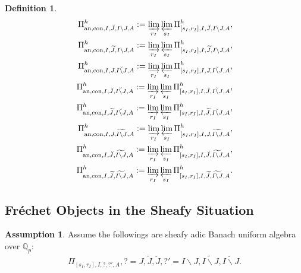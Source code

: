 \documentclass[12pt]{amsart}
\theoremstyle{definition}
\newtheorem{definition}[theorem]{Definition}
\numberwithin{equation}{section}
\newtheorem{assumption}[theorem]{Assumption}
\begin{document}
\begin{definition}
\begin{align}
\Pi^h_{\mathrm{an},\mathrm{con},I,\breve{J},I\backslash J,A}:=\varinjlim_{r_I}\varprojlim_{s_I}\Pi^h_{[s_I,r_I],I,\breve{J},I\backslash J,A},\\	
\Pi^h_{\mathrm{an},\mathrm{con},I,\widetilde{J},I\backslash J,A}:=\varinjlim_{r_I}\varprojlim_{s_I} \Pi^h_{[s_I,r_I],I,\widetilde{J},I\backslash J,A},\\
\Pi^h_{\mathrm{an},\mathrm{con},I,J,\breve{I\backslash J},A}:=\varinjlim_{r_I}\varprojlim_{s_I}\Pi^h_{[s_I,r_I],I,J,\breve{I\backslash J},A},\\	
\Pi^h_{\mathrm{an},\mathrm{con},I,\breve{J},\breve{I\backslash J},A}:=\varinjlim_{r_I}\varprojlim_{s_I} \Pi^h_{[s_I,r_I],I,\breve{J},\breve{I\backslash J},A},\\
\Pi^h_{\mathrm{an},\mathrm{con},I,\widetilde{J},\breve{I\backslash J},A}:=\varinjlim_{r_I}\varprojlim_{s_I} \Pi^h_{[s_I,r_I],I,\widetilde{J},\breve{I\backslash J},A},\\
\Pi^h_{\mathrm{an},\mathrm{con},I,J,\widetilde{I\backslash J},A}:=\varinjlim_{r_I}\varprojlim_{s_I} \Pi^h_{[s_I,r_I],I,J,\widetilde{I\backslash J},A},\\	
\Pi^h_{\mathrm{an},\mathrm{con},I,\breve{J},\widetilde{I\backslash J},A}:=\varinjlim_{r_I}\varprojlim_{s_I} \Pi^h_{[s_I,r_I],I,\breve{J},\widetilde{I\backslash J},A},\\	
\Pi^h_{\mathrm{an},\mathrm{con},I,\widetilde{J},\widetilde{I\backslash J},A}:=\varinjlim_{r_I}\varprojlim_{s_I} \Pi^h_{[s_I,r_I],I,\widetilde{J},\widetilde{I\backslash J},A}.\\	
\end{align}	
\end{definition}



\subsection{Fr\'echet Objects in the Sheafy Situation}


\begin{assumption}
Assume the followings are sheafy adic Banach uniform algebra over $\mathbb{Q}_p$:
\begin{align}
\Pi_{[s_I,r_I],I,?,?',A},?=J,\widetilde{J},\breve{J},?'=I\backslash J,\widetilde{I\backslash J},\breve{I\backslash J}.	
\end{align}	
\end{assumption}
\end{document}
